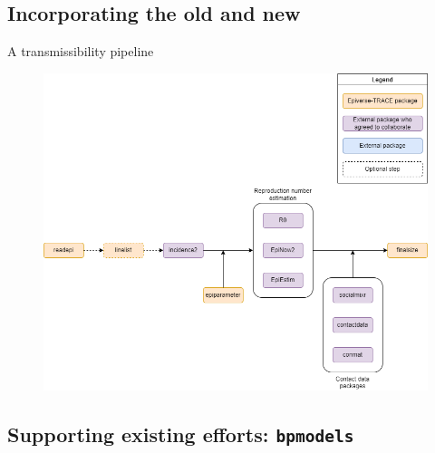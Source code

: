 \documentclass[10pt]{beamer}
\begin{document}
\subsection{Incorporating the old and new}
\begin{frame}[fragile]{A transmissibility pipeline}
	\begin{figure}
		\centering
		\includegraphics[scale=0.35]{../figures/transmissibility_pipeline.png}
	\end{figure}
\end{frame}


\subsection{Supporting existing efforts: \texttt{bpmodels}}
\end{document}
